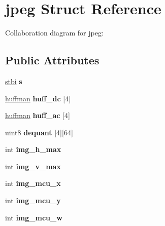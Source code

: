 \hypertarget{structjpeg}{\section{jpeg Struct Reference}
\label{structjpeg}
}


Collaboration diagram for jpeg\-:
\subsection*{Public Attributes}
\begin{DoxyCompactItemize}
\item 
\hypertarget{structjpeg_a4ff7c3b459e6bb03945eb220ba85f404}{\hyperlink{structstbi}{stbi} {\bfseries s}}\label{structjpeg_a4ff7c3b459e6bb03945eb220ba85f404}

\item 
\hypertarget{structjpeg_aae44f91bafcc73fa70544573458abe33}{\hyperlink{structhuffman}{huffman} {\bfseries huff\-\_\-dc} \mbox{[}4\mbox{]}}\label{structjpeg_aae44f91bafcc73fa70544573458abe33}

\item 
\hypertarget{structjpeg_a6fab0b2d90425db5d609edbde8bddd92}{\hyperlink{structhuffman}{huffman} {\bfseries huff\-\_\-ac} \mbox{[}4\mbox{]}}\label{structjpeg_a6fab0b2d90425db5d609edbde8bddd92}

\item 
\hypertarget{structjpeg_aae820981dde2c49bc05b6e1298143d21}{uint8 {\bfseries dequant} \mbox{[}4\mbox{]}\mbox{[}64\mbox{]}}\label{structjpeg_aae820981dde2c49bc05b6e1298143d21}

\item 
\hypertarget{structjpeg_af4ed1173241e83f1482a276a178ce9e5}{int {\bfseries img\-\_\-h\-\_\-max}}\label{structjpeg_af4ed1173241e83f1482a276a178ce9e5}

\item 
\hypertarget{structjpeg_a50690c7d415968f864f4f1c10b85082d}{int {\bfseries img\-\_\-v\-\_\-max}}\label{structjpeg_a50690c7d415968f864f4f1c10b85082d}

\item 
\hypertarget{structjpeg_a8a7f2486617a69e9b88c9a161560c8a5}{int {\bfseries img\-\_\-mcu\-\_\-x}}\label{structjpeg_a8a7f2486617a69e9b88c9a161560c8a5}

\item 
\hypertarget{structjpeg_afa9d2c991eff0959c0c8b65ab186243b}{int {\bfseries img\-\_\-mcu\-\_\-y}}\label{structjpeg_afa9d2c991eff0959c0c8b65ab186243b}

\item 
\hypertarget{structjpeg_a32f06fea63ec2c976092760b21abad72}{int {\bfseries img\-\_\-mcu\-\_\-w}}\label{structjpeg_a32f06fea63ec2c976092760b21abad72}


\end{DoxyCompactItemize}
